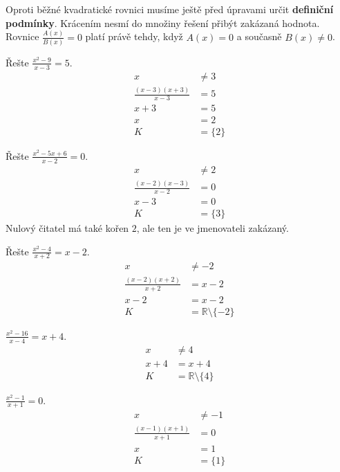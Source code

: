 \documentclass[11pt,a4paper]{article}
\begin{document}
Oproti běžné kvadratické rovnici musíme ještě před úpravami určit
\textbf{definiční podmínky}. Krácením nesmí do množiny řešení přibýt
zakázaná hodnota. Rovnice $\frac{A(x)}{B(x)}=0$ platí právě tehdy,
když $A(x)=0$ a současně $B(x)\ne0$.
\begin{prikladReseniBox}[title={Příklad 1}]
Řešte $\frac{x^2-9}{x-3}=5$.
\tcblower
\[\begin{aligned}x&\ne3\\\frac{(x-3)(x+3)}{x-3}&=5\\x+3&=5\\x&=2\\K&=\{2\}\end{aligned}\]
\end{prikladReseniBox}
\begin{prikladReseniBox}[title={Příklad 2}]
Řešte $\frac{x^2-5x+6}{x-2}=0$.
\tcblower
\[\begin{aligned}x&\ne2\\\frac{(x-2)(x-3)}{x-2}&=0\\x-3&=0\\K&=\{3\}\end{aligned}\]
Nulový čitatel má také kořen $2$, ale ten je ve jmenovateli zakázaný.
\end{prikladReseniBox}
\begin{prikladReseniBox}[title={Příklad 3}]
Řešte $\frac{x^2-4}{x+2}=x-2$.
\tcblower
\[\begin{aligned}x&\ne-2\\\frac{(x-2)(x+2)}{x+2}&=x-2\\x-2&=x-2\\K&=\mathbb R\setminus\{-2\}\end{aligned}\]
\end{prikladReseniBox}
\begin{zadaniReseniBox}[title={Samostatná práce 1}]
$\frac{x^2-16}{x-4}=x+4$.
\tcblower
\[\begin{aligned}x&\ne4\\x+4&=x+4\\K&=\mathbb R\setminus\{4\}\end{aligned}\]
\end{zadaniReseniBox}
\begin{zadaniReseniBox}[title={Samostatná práce 2}]
$\frac{x^2-1}{x+1}=0$.
\tcblower
\[\begin{aligned}x&\ne-1\\\frac{(x-1)(x+1)}{x+1}&=0\\x&=1\\K&=\{1\}\end{aligned}\]
\end{zadaniReseniBox}
\end{document}
